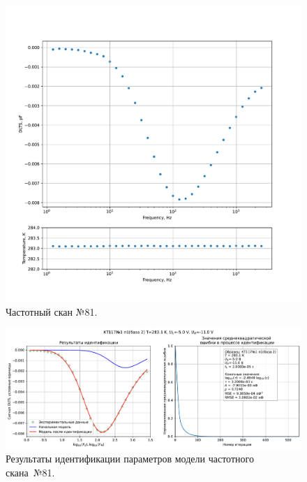 \begin{figure}[!ht]
    \centering
    \includegraphics[width=1\textwidth]{../plots/КТ117№1_п1(база 2)_2500Гц-1Гц_1пФ_+10С_-5В-11В_100мВ_20мкс_шаг_0,1.pdf}
    \caption{Частотный скан №81.}
    \label{pic:frequency_scan_81}
\end{figure}

\begin{figure}[!ht]
    \centering
    \includegraphics[width=1\textwidth]{../plots/КТ117№1_п1(база 2)_2500Гц-1Гц_1пФ_+10С_-5В-11В_100мВ_20мкс_шаг_0,1_model.pdf}
    \caption{Результаты идентификации параметров модели частотного скана~№81.}
    \label{pic:frequency_scan_model81}
\end{figure}

\pagebreak


